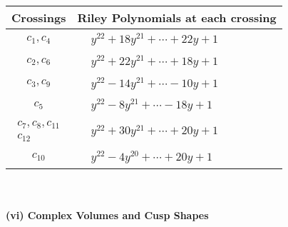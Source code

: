 \documentclass[1p]{elsarticle_modified}
\theoremstyle{definition}
\begin{document}
\begin{tabular}{m{50pt}|m{274pt}}
Crossings & \hspace{64pt}Riley Polynomials at each crossing \\
\hline $$\begin{aligned}c_{1},c_{4}\end{aligned}$$&$\begin{aligned}
&y^{22}+18 y^{21}+\cdots+22 y+1
\end{aligned}$\\
\hline $$\begin{aligned}c_{2},c_{6}\end{aligned}$$&$\begin{aligned}
&y^{22}+22 y^{21}+\cdots+18 y+1
\end{aligned}$\\
\hline $$\begin{aligned}c_{3},c_{9}\end{aligned}$$&$\begin{aligned}
&y^{22}-14 y^{21}+\cdots-10 y+1
\end{aligned}$\\
\hline $$\begin{aligned}c_{5}\end{aligned}$$&$\begin{aligned}
&y^{22}-8 y^{21}+\cdots-18 y+1
\end{aligned}$\\
\hline $$\begin{aligned}c_{7},c_{8},c_{11}\\c_{12}\end{aligned}$$&$\begin{aligned}
&y^{22}+30 y^{21}+\cdots+20 y+1
\end{aligned}$\\
\hline $$\begin{aligned}c_{10}\end{aligned}$$&$\begin{aligned}
&y^{22}-4 y^{20}+\cdots+20 y+1
\end{aligned}$\\
\hline
\end{tabular}\\~\\
\newpage\flushleft \textbf{(vi) Complex Volumes and Cusp Shapes}
\end{document}
